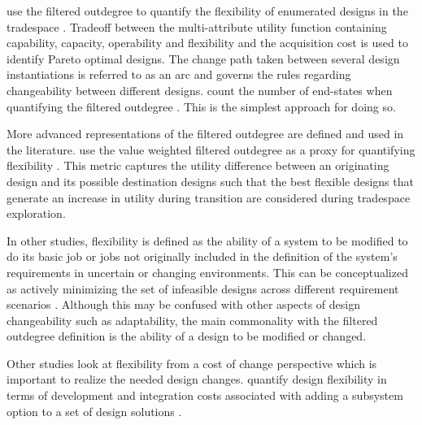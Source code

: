 \citeauthor{Rehn2018} use the filtered outdegree to quantify the flexibility of enumerated designs in the tradespace \cite{Rehn2018}. Tradeoff between the multi-attribute utility function containing capability, capacity, operability and flexibility and the acquisition cost is used to identify Pareto optimal designs. The change path taken between several design instantiations is referred to as an arc \cite{Rehn2018, Viscito2009, Ross2008, Rapp2018} and governs the rules regarding changeability between different designs. \citeauthor{Rehn2018} count the number of end-states when quantifying the filtered outdegree \cite{Rehn2018}. This is the simplest approach for doing so.

More advanced representations of the filtered outdegree are defined and used in the literature. \citeauthor{Viscito2009} use the value weighted filtered outdegree as a proxy for quantifying flexibility \cite{Viscito2009}. This metric captures the utility difference between an originating design and its possible destination designs such that the best flexible designs that generate an increase in utility during transition are considered during tradespace exploration.

In other studies, flexibility is defined as the ability of a system to be modified to do its basic job or jobs not originally included in the definition of the system’s requirements in uncertain or changing environments. This can be conceptualized as actively minimizing the set of infeasible designs across different requirement scenarios \cite{Chalupnik2013}. Although this may be confused with other aspects of design changeability such as adaptability, the main commonality with the filtered outdegree definition is the ability of a design to be modified or changed.

Other studies look at flexibility from a cost of change perspective which is important to realize the needed design changes. \citeauthor{Rapp2018} quantify design flexibility in terms of development and integration costs associated with adding a subsystem option to a set of design solutions \cite{Rapp2018}. 

